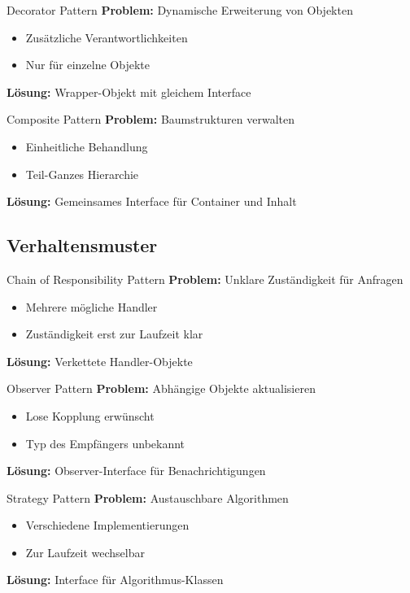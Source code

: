 \begin{definition}{Decorator Pattern}
\textbf{Problem:} Dynamische Erweiterung von Objekten
\begin{itemize}
    \item Zusätzliche Verantwortlichkeiten
    \item Nur für einzelne Objekte
\end{itemize}
\textbf{Lösung:} Wrapper-Objekt mit gleichem Interface
\end{definition}

\begin{definition}{Composite Pattern}
\textbf{Problem:} Baumstrukturen verwalten
\begin{itemize}
    \item Einheitliche Behandlung
    \item Teil-Ganzes Hierarchie
\end{itemize}
\textbf{Lösung:} Gemeinsames Interface für Container und Inhalt
\end{definition}

\subsection{Verhaltensmuster}

\begin{definition}{Chain of Responsibility Pattern}
\textbf{Problem:} Unklare Zuständigkeit für Anfragen
\begin{itemize}
    \item Mehrere mögliche Handler
    \item Zuständigkeit erst zur Laufzeit klar
\end{itemize}
\textbf{Lösung:} Verkettete Handler-Objekte
\end{definition}

\begin{definition}{Observer Pattern}
\textbf{Problem:} Abhängige Objekte aktualisieren
\begin{itemize}
    \item Lose Kopplung erwünscht
    \item Typ des Empfängers unbekannt
\end{itemize}
\textbf{Lösung:} Observer-Interface für Benachrichtigungen
\end{definition}

\begin{definition}{Strategy Pattern}
\textbf{Problem:} Austauschbare Algorithmen
\begin{itemize}
    \item Verschiedene Implementierungen
    \item Zur Laufzeit wechselbar
\end{itemize}
\textbf{Lösung:} Interface für Algorithmus-Klassen
\end{definition}

